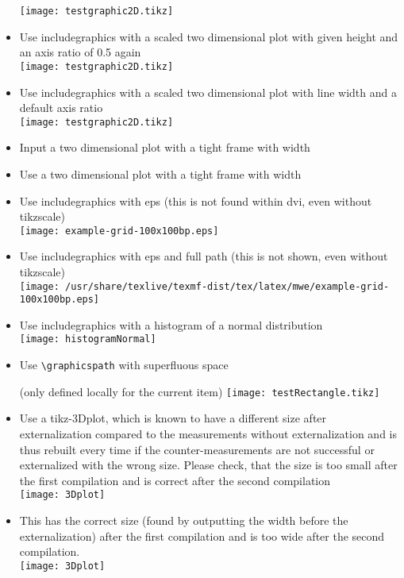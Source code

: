 \documentclass[twocolumn]{article}
\providecommand\tikzexternalenable{}
\providecommand\tikzexternaldisable{}
\begin{document}
\begin{itemize}
				\tikzexternaldisable
				\texttt{[image: testgraphic2D.tikz]}%
				\tikzexternalenable
			\item Use includegraphics with a scaled two dimensional plot with given height and an axis ratio of 0.5 again\\%
				\texttt{[image: testgraphic2D.tikz]}%
			\item Use includegraphics with a scaled two dimensional plot with line width and a default axis ratio\\%
				\texttt{[image: testgraphic2D.tikz]}%
			\item Input a two dimensional plot with a tight frame with width \newlength{\mylen}\settowidth{\mylen}{\frame{}}\the\mylen\\%
				\frame{}
			\item Use a two dimensional plot with a tight frame with width \the\mylen\\%
		\else
			\item Use includegraphics with eps (this is not found within dvi, even without tikzscale)\\%
				\texttt{[image: example-grid-100x100bp.eps]}%
			\item Use includegraphics with eps and full path (this is not shown, even without tikzscale)\\%
				\texttt{[image: /usr/share/texlive/texmf-dist/tex/latex/mwe/example-grid-100x100bp.eps]}%
		\fi
		\item Use includegraphics with a histogram of a normal distribution\\%
			\texttt{[image: histogramNormal]}%
		\item {Use \texttt{\textbackslash graphicspath} with superfluous space\graphicspath{{somefolder} } (only defined locally for the current item)
			\texttt{[image: testRectangle.tikz]}}%
		\item Use a tikz-3Dplot, which is known to have a different size after externalization compared to the measurements without externalization and is thus rebuilt every time if the counter-measurements are not successful or externalized with the wrong size. Please check, that the size is too small after the first compilation and is correct after the second compilation\\%
			\texttt{[image: 3Dplot]}
		\item This has the correct size (found by outputting the width before the externalization) after the first compilation and is too wide after the second compilation.\\%
			\texttt{[image: 3Dplot]}
	\end{itemize}
\end{document}
